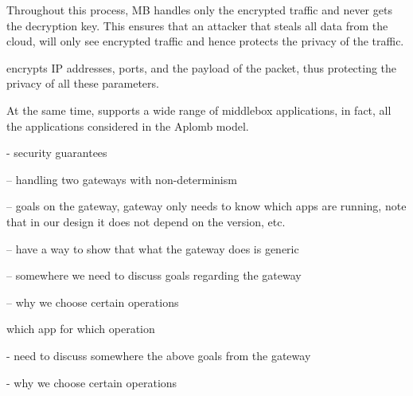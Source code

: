 Throughout this process, MB handles only the encrypted traffic and never gets the decryption key. This ensures
that an attacker that steals all data from the cloud, will only see encrypted traffic and hence protects the privacy of the 
traffic. 

\sys encrypts IP addresses, ports, and the payload of the packet, thus protecting the privacy of all these parameters. 

At the same time, \sys supports a wide range of middlebox applications, in fact, all the applications considered in the 
Aplomb model.




- security guarantees


-- handling two gateways with non-determinism




-- goals on the gateway, gateway only needs to know which apps are running, note that in our design
it does not depend on the version, etc. 

-- have a way to show that what the gateway does is generic 
   
-- somewhere we need to discuss goals regarding the gateway

-- why we choose certain operations

which app for which operation


- need to discuss somewhere the above goals from the gateway


- why we choose certain operations

